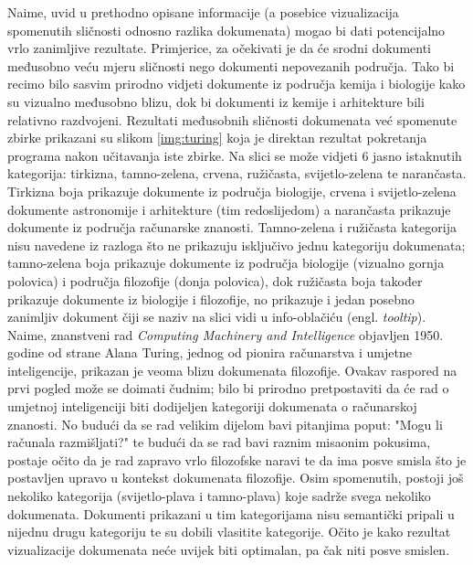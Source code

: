 \documentclass[times, utf8, zavrsni]{fer}
\begin{document}
Naime, uvid u prethodno opisane informacije (a posebice vizualizacija spomenutih sličnosti odnosno razlika dokumenata) mogao bi dati potencijalno vrlo zanimljive rezultate. Primjerice, za očekivati je da će srodni dokumenti međusobno veću mjeru sličnosti nego dokumenti nepovezanih područja. Tako bi recimo bilo sasvim prirodno vidjeti dokumente iz područja kemija i biologije kako su vizualno međusobno blizu, dok bi dokumenti iz kemije i arhitekture bili relativno razdvojeni. Rezultati međusobnih sličnosti dokumenata već spomenute zbirke prikazani su slikom \ref{img:turing} koja je direktan rezultat pokretanja programa nakon učitavanja iste zbirke. Na slici se može vidjeti 6 jasno istaknutih kategorija: tirkizna, tamno-zelena, crvena, ružičasta, svijetlo-zelena te narančasta. Tirkizna boja prikazuje dokumente iz područja biologije, crvena i svijetlo-zelena dokumente astronomije i arhitekture (tim redoslijedom) a narančasta prikazuje dokumente iz područja računarske znanosti. Tamno-zelena i ružičasta kategorija nisu navedene iz razloga što ne prikazuju isključivo jednu kategoriju dokumenata; tamno-zelena boja prikazuje dokumente iz područja biologije (vizualno gornja polovica) i područja filozofije (donja polovica), dok ružičasta boja također prikazuje dokumente iz biologije i filozofije, no prikazuje i jedan posebno zanimljiv dokument čiji se naziv na slici vidi u info-oblačiću (engl. \textit{tooltip}). Naime, znanstveni rad \textit{Computing Machinery and Intelligence} objavljen 1950. godine od strane Alana Turing, jednog od pionira računarstva i umjetne inteligencije, prikazan je veoma blizu dokumenata filozofije. Ovakav raspored na prvi pogled može se doimati čudnim; bilo bi prirodno pretpostaviti da će rad o umjetnoj inteligenciji biti dodijeljen kategoriji dokumenata o računarskoj znanosti. No budući da se rad velikim dijelom bavi pitanjima poput: "Mogu li računala razmišljati?" te budući da se rad bavi raznim misaonim pokusima, postaje očito da je rad zapravo vrlo filozofske naravi te da ima posve smisla što je postavljen upravo u kontekst dokumenata filozofije. Osim spomenutih, postoji još nekoliko kategorija (svijetlo-plava i tamno-plava) koje sadrže svega nekoliko dokumenata. Dokumenti prikazani u tim kategorijama nisu semantički pripali u nijednu drugu kategoriju te su dobili vlasitite kategorije. Očito je kako rezultat vizualizacije dokumenata neće uvijek biti optimalan, pa čak niti posve smislen.
\end{document}

